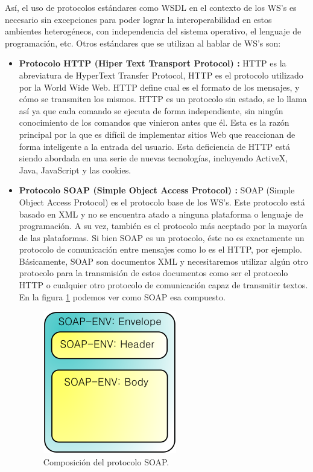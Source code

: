 Así, el uso de protocolos estándares como WSDL en el contexto de los WS's es necesario sin excepciones para poder lograr la interoperabilidad en estos ambientes heterogéneos, con independencia del sistema operativo, el lenguaje de programación, etc. Otros estándares que se utilizan al hablar de WS's son:
\begin{itemize}
	
	\item \textbf{Protocolo HTTP (Hiper Text Transport Protocol) \cite{HTTP}:}
	 HTTP es la abreviatura de HyperText Transfer Protocol, HTTP es el protocolo utilizado por la World Wide Web. HTTP define cual es el formato de los mensajes, y cómo se transmiten los mismos. HTTP es un protocolo sin estado, se lo llama así  ya que cada comando se ejecuta de forma independiente, sin ningún conocimiento de los comandos que vinieron antes que él. Esta es la razón principal por la que es difícil de implementar sitios Web que reaccionan de forma inteligente a la entrada del usuario. Esta deficiencia de HTTP está siendo abordada en una serie de nuevas tecnologías, incluyendo ActiveX, Java, JavaScript y las cookies.
	
	\item \textbf{Protocolo SOAP (Simple Object Access Protocol) \cite{SOAP}: }
	SOAP (Simple Object Access Protocol) es el protocolo base de los WS's. Este protocolo está basado en XML y no se encuentra atado a ninguna plataforma o lenguaje de programación. A su vez, también es el protocolo más aceptado por la mayoría de las plataformas. 
	Si bien SOAP es un protocolo, éste no es exactamente un protocolo de comunicación entre mensajes como lo es el HTTP, por ejemplo. Básicamente, SOAP son documentos XML y necesitaremos utilizar algún otro protocolo para la transmisión de estos documentos como ser el protocolo HTTP o cualquier otro protocolo de comunicación capaz de transmitir textos. En la figura \ref{fig:Composición del protocolo SOAP} podemos ver como SOAP esa compuesto.
	



\begin{figure}[!h] 
	\begin{center}
		\includegraphics [scale=0.50]{imagenes/Composicion_del_protocolo_SOAP.png}
	\end{center}
	\caption{Composición del protocolo SOAP.}
	\label{fig:Composición del protocolo SOAP}
\end{figure} 


\end{itemize}
